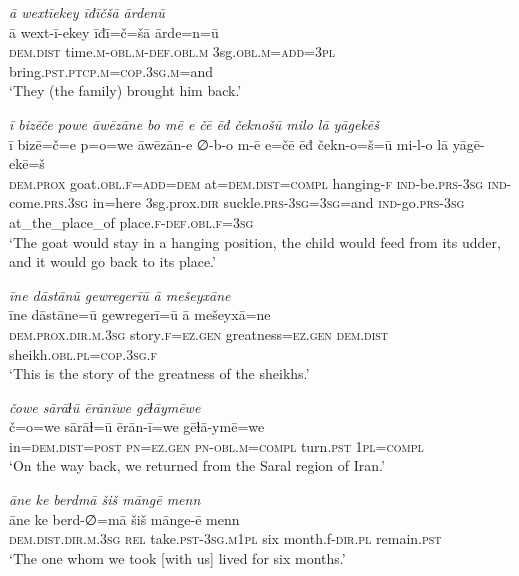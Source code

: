 \ea \label{ZB.50}
\textit{ā wextīekey īđīčšā ārdenū} \\ 
\gll ā wext-ī-ekey īđī=č=šā ārde=n=ū \\ 
 \textsc{dem.dist} time\textsc{.m}\textsc{-obl}\textsc{.m}\textsc{-def}\textsc{.obl}\textsc{.m} 3sg\textsc{.obl}\textsc{.m}\textsc{=add}\textsc{=3pl} bring\textsc{.pst}\textsc{.ptcp}\textsc{.m}\textsc{=cop}\textsc{.3sg}\textsc{.m}=and \\ 
\glt `They (the family) brought him back.'
\z 
 
\ea \label{ZB.54}
\textit{ī bizēče powe āwēzāne bo mē e čē ēđ čeknošū milo lā yāgekēš} \\ 
\gll ī bizē=č=e p=o=we āwēzān-e ∅-b-o m-ē e=čē ēđ čekn-o=š=ū mi-l-o lā yāgē-ekē=š \\ 
 \textsc{dem.prox} goat\textsc{.obl}\textsc{.f}\textsc{=add}\textsc{=dem} at=\textsc{dem.dist}\textsc{=compl} hanging\textsc{-f} \textsc{ind-}be\textsc{.prs}\textsc{-3sg} \textsc{ind-}come\textsc{.prs}\textsc{.3sg} in=here 3sg.prox\textsc{.dir} suckle\textsc{.prs}\textsc{-3sg}\textsc{=3sg}=and \textsc{ind-}go\textsc{.prs}\textsc{-3sg} at\_the\_place\_of place\textsc{.f}\textsc{-def}\textsc{.obl}\textsc{.f}\textsc{=3sg} \\ 
\glt `The goat would stay in a hanging position, the child would feed from its udder, and it would go back to its place.'
\z 
 
\ea \label{ZB.58}
\textit{īne dāstānū gewregerīū ā mešeyxāne} \\ 
\gll īne dāstāne=ū gewregerī=ū ā mešeyxā=ne \\ 
 \textsc{dem.prox}\textsc{.dir}\textsc{.m}\textsc{.3sg} story\textsc{.f}\textsc{\textsc{=ez.gen}} greatness\textsc{\textsc{=ez.gen}} \textsc{dem.dist} sheikh\textsc{.obl}\textsc{.pl}\textsc{=cop}\textsc{.3sg}\textsc{.f} \\ 
\glt `This is the story of the greatness of the sheikhs.'
\z 
 
\ea \label{ZQ.10}
\textit{čowe sārāɫū ērānīwe gēɫāymēwe} \\ 
\gll č=o=we sārāɫ=ū ērān-ī=we gēɫā-ymē=we \\ 
 in=\textsc{dem.dist}\textsc{=\textsc{post}} \textsc{pn}\textsc{=ez.gen} \textsc{pn}\textsc{-obl}\textsc{.m}\textsc{=compl} turn\textsc{.pst} \textsc{1pl}\textsc{=compl} \\ 
\glt `On the way back, we returned from the Saral region of Iran.'
\z 
 
\ea \label{ZQ.29}
\textit{āne ke berdmā šiš māngē menn} \\ 
\gll āne ke berd-∅=mā šiš mānge-ē menn \\ 
 \textsc{dem.dist}\textsc{.dir}\textsc{.m}\textsc{.3sg} \textsc{rel} take\textsc{.pst}\textsc{-3sg}\textsc{.m}\textsc{1pl} six month.f\textsc{-dir}\textsc{.pl} remain\textsc{.pst} \\ 
\glt `The one whom we took [with us] lived for six months.'
\z 
 
